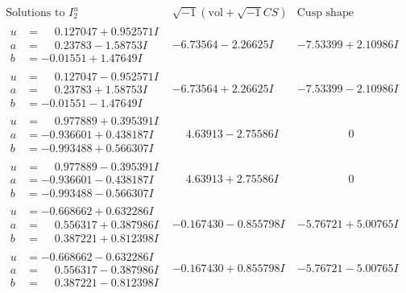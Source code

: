 \documentclass[1p]{elsarticle_modified}
\theoremstyle{definition}
\newcommand{\I}{\sqrt{-1}}
\begin{document}
$$\begin{array}{c|c|c}  
\text{Solutions to }I^u_{2}& \I (\text{vol} + \sqrt{-1}CS) & \text{Cusp shape}\\
 \hline 
\begin{aligned}
u &= \phantom{-}0.127047 + 0.952571 I \\
a &= \phantom{-}0.23783 - 1.58753 I \\
b &= -0.01551 + 1.47649 I\end{aligned}
 & -6.73564 - 2.26625 I & -7.53399 + 2.10986 I \\ \hline\begin{aligned}
u &= \phantom{-}0.127047 - 0.952571 I \\
a &= \phantom{-}0.23783 + 1.58753 I \\
b &= -0.01551 - 1.47649 I\end{aligned}
 & -6.73564 + 2.26625 I & -7.53399 - 2.10986 I \\ \hline\begin{aligned}
u &= \phantom{-}0.977889 + 0.395391 I \\
a &= -0.936601 + 0.438187 I \\
b &= -0.993488 + 0.566307 I\end{aligned}
 & \phantom{-}4.63913 - 2.75586 I & \phantom{-0.000000 } 0 \\ \hline\begin{aligned}
u &= \phantom{-}0.977889 - 0.395391 I \\
a &= -0.936601 - 0.438187 I \\
b &= -0.993488 - 0.566307 I\end{aligned}
 & \phantom{-}4.63913 + 2.75586 I & \phantom{-0.000000 } 0 \\ \hline\begin{aligned}
u &= -0.668662 + 0.632286 I \\
a &= \phantom{-}0.556317 + 0.387986 I \\
b &= \phantom{-}0.387221 + 0.812398 I\end{aligned}
 & -0.167430 - 0.855798 I & -5.76721 + 5.00765 I \\ \hline\begin{aligned}
u &= -0.668662 - 0.632286 I \\
a &= \phantom{-}0.556317 - 0.387986 I \\
b &= \phantom{-}0.387221 - 0.812398 I\end{aligned}
 & -0.167430 + 0.855798 I & -5.76721 - 5.00765 I \\ \hline\begin{aligned}

\end{aligned}
\end{array}$$
\end{document}
